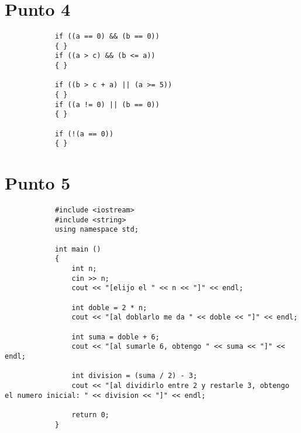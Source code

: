 \documentclass[10pt]{article}
\begin{document}
    
    \section*{Punto 4}
        \begin{verbatim}
            if ((a == 0) && (b == 0))
            { }
            if ((a > c) && (b <= a))
            { }
            
            if ((b > c + a) || (a >= 5))
            { }
            if ((a != 0) || (b == 0))
            { }
            
            if (!(a == 0))
            { }
        \end{verbatim}
    
    
    \section*{Punto 5}
        \begin{verbatim}
            #include <iostream>
            #include <string>
            using namespace std;
            
            int main ()
            {
                int n;
                cin >> n;
                cout << "[elijo el " << n << "]" << endl;
            
                int doble = 2 * n;
                cout << "[al doblarlo me da " << doble << "]" << endl;
            
                int suma = doble + 6;
                cout << "[al sumarle 6, obtengo " << suma << "]" << endl;
                
                int division = (suma / 2) - 3;
                cout << "[al dividirlo entre 2 y restarle 3, obtengo el numero inicial: " << division << "]" << endl;
            
                return 0;
            }
        \end{verbatim}
\end{document}
